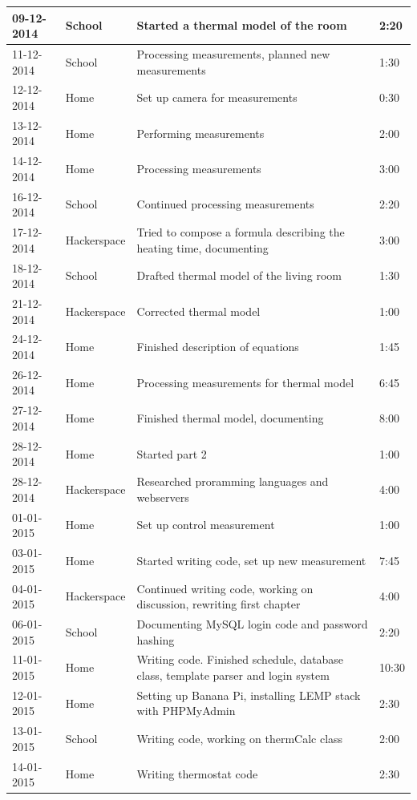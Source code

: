 \documentclass[12pt,a4paper,final]{report}
\begin{document}
\begin{longtable}{ | p{2.5cm} | p{2.5cm} | p{5cm} | p{2cm} |}
	\hline
	09-12-2014 & School & Started a thermal model of the room & 2:20 \\
	\hline
	11-12-2014 & School & Processing measurements, planned new measurements & 1:30 \\
	\hline
	12-12-2014 & Home & Set up camera for measurements & 0:30 \\
	\hline
	13-12-2014 & Home & Performing measurements & 2:00 \\
	\hline
	14-12-2014 & Home & Processing measurements & 3:00  \\
	\hline
	16-12-2014 & School & Continued processing measurements & 2:20 \\
	\hline
	17-12-2014 & Hackerspace & Tried to compose a formula describing the heating time, documenting & 3:00 \\
	\hline
	18-12-2014 & School & Drafted thermal model of the living room & 1:30 \\
	\hline
	21-12-2014 & Hackerspace & Corrected thermal model & 1:00 \\
	\hline
	24-12-2014 & Home & Finished description of equations & 1:45 \\
	\hline
	26-12-2014 & Home & Processing measurements for thermal model & 6:45 \\
	\hline
	27-12-2014 & Home & Finished thermal model, documenting & 8:00 \\
	\hline
	28-12-2014 & Home & Started part 2 & 1:00 \\
	\hline
	28-12-2014 & Hackerspace & Researched proramming languages and webservers & 4:00 \\
	\hline
	01-01-2015 & Home & Set up control measurement & 1:00 \\
	\hline
	03-01-2015 & Home & Started writing code, set up new measurement & 7:45 \\
	\hline
	04-01-2015 & Hackerspace & Continued writing code, working on discussion, rewriting first chapter & 4:00 \\
	\hline
	06-01-2015 & School & Documenting MySQL login code and password hashing & 2:20 \\
	\hline
	11-01-2015 & Home & Writing code. Finished schedule, database class, template parser and login system & 10:30 \\
	\hline
	12-01-2015 & Home & Setting up Banana Pi, installing LEMP stack with PHPMyAdmin & 2:30 \\
	\hline
	13-01-2015 & School & Writing code, working on thermCalc class & 2:00 \\
	\hline
	14-01-2015 & Home & Writing thermostat code & 2:30 \\

\end{longtable}
\end{document}
